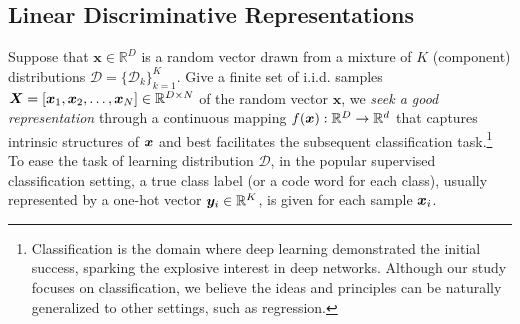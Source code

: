 \documentclass[../../book-main.tex]{subfiles}
\begin{document}





\subsection{Linear Discriminative Representations}\label{subsec:LDR}

Suppose that $\bm{x} \in \mathbb{R}^D$ is a random vector drawn from a mixture of $K$ (component) distributions  $\mathcal{D} = \{\mathcal{D}_k\}_{k=1}^K$. Give a finite set of i.i.d. samples $\bm{X} = [\bm{x}_1, \bm{x}_2, \ldots, \bm{x}_N] \in \mathbb{R}^{D\times N}$ of the random vector $\bm x$, we {\em seek a good representation}  through a continuous mapping $f(\bm{x}): \mathbb{R}^D \rightarrow \mathbb{R}^d$ that captures intrinsic structures of $\bm{x}$ and best facilitates the subsequent classification task.\footnote{Classification is the domain where deep learning demonstrated the initial success, sparking the explosive interest in deep networks. Although our study focuses on classification, we believe the ideas and principles can be naturally generalized to other settings, such as regression.} To ease the task of learning distribution $\mathcal{D}$, in the popular supervised classification setting, a true class label (or a code word for each class), usually represented by a one-hot vector $\bm{y}_i \in \mathbb{R}^K$, is given for each sample $\bm{x}_i$.

 

\end{document}
